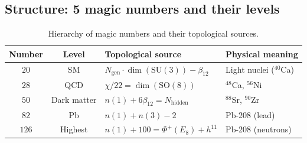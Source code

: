 \documentclass[11pt,a4paper]{article}
\newcommand{\SU}{\mathrm{SU}}
\newcommand{\SO}{\mathrm{SO}}
\newcommand{\Ngen}{N_{\text{gen}}}
\newcommand{\Nhidden}{N_{\text{hidden}}}
\theoremstyle{definition}
\begin{document}
\subsection{Structure: 5 magic numbers and their levels}
\label{subsec:magic-levels}

\begin{table}[htbp]
\centering
\caption{Hierarchy of magic numbers and their topological sources.}
\label{tab:magic-levels}
\begin{tabular}{ccll}
\toprule
Number & Level & Topological source & Physical meaning \\
\midrule
$20$ & SM & $\Ngen \cdot \dim(\SU(3)) - \beta_{12}$ & 
    Light nuclei ($^{40}$Ca) \\[0.3em]
$28$ & QCD & $\chi / 22 = \dim(\SO(8))$ & 
    $^{48}$Ca, $^{56}$Ni \\[0.3em]
$50$ & Dark matter & $n(1) + 6\beta_{12} = \Nhidden$ & 
    $^{88}$Sr, $^{90}$Zr \\[0.3em]
$82$ & Pb & $n(1) + n(3) - 2$ & 
    Pb-208 (lead) \\[0.3em]
$126$ & Highest & $n(1) + 100 = \Phi^+(E_8) + h^{11}$ & 
    Pb-208 (neutrons) \\
\bottomrule
\end{tabular}
\end{table}
\end{document}
